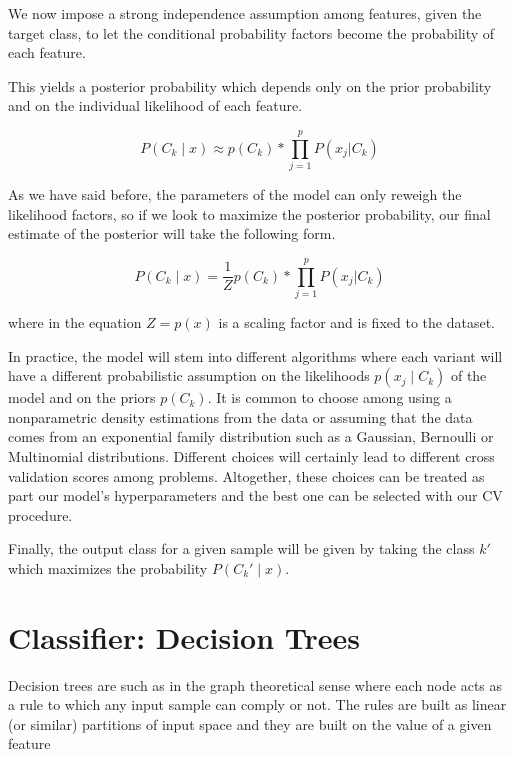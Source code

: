 We now impose a strong independence assumption among features, given the target class, to let the conditional probability factors become the probability of each feature. %

This yields a posterior probability which depends only on the prior probability and on the individual likelihood of each feature.

\begin{equation}
P(C_k \mid x) \approx p(C_k) * \prod_{j=1}^{p}  P(x_j | C_k)
\end{equation}\label{eq:posteriorProbabilityDecomposition2}

As we have said before, the parameters of the model can only reweigh the likelihood factors, so if we look to maximize the posterior probability, our final estimate of the posterior will take the following form.

\begin{equation}
P(C_k \mid x) = \frac{1}{Z} p(C_k) * \prod_{j=1}^{p}  P(x_j | C_k)
\end{equation}\label{equation-posteriorProbabilityDecomposition3}

where in the equation $Z = p(x)$ is a scaling factor and is fixed to the dataset.

In practice, the model will stem into different algorithms where each variant will have a different probabilistic assumption on the likelihoods $p(x_j \mid C_k)$ of the model and on the priors $p(C_k)$. It is common to choose among using a nonparametric density estimations from the data or assuming that the data comes from an exponential family distribution such as a Gaussian, Bernoulli or Multinomial distributions. Different choices will certainly lead to different cross validation scores among problems. Altogether, these choices can be treated as part our model's hyperparameters and the best one can be selected with our CV procedure.


Finally, the output class for a given sample will be given by taking the class $k'$ which maximizes the probability $P(C_k' \mid x)$.

\section{Classifier: Decision Trees}\label{section:decision_trees}


Decision trees are such as in the graph theoretical sense where each node acts as a rule to which any input sample can comply or not. The rules are built as linear (or similar) partitions of input space and they are built on the value of a given feature

